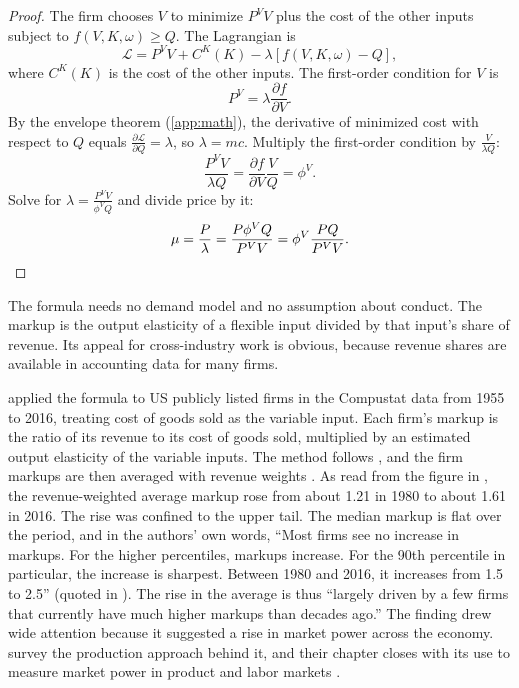 \begin{proof}
The firm chooses $V$ to minimize $P^V V$ plus the cost of the other inputs subject to $f(V, K, \omega) \ge
Q$. The Lagrangian is
\[
\mathcal{L} = P^V V + C^K(K) - \lambda \left[ f(V, K, \omega) - Q \right],
\]
where $C^K(K)$ is the cost of the other inputs. The first-order condition for $V$ is
\[
P^V = \lambda \frac{\partial f}{\partial V}.
\]
By the envelope theorem (\cref{app:math}), the derivative of minimized cost with respect to $Q$ equals
$\frac{\partial \mathcal{L}}{\partial Q} = \lambda$, so $\lambda = mc$. Multiply the first-order condition
by $\frac{V}{\lambda Q}$:
\[
\frac{P^V V}{\lambda Q} = \frac{\partial f}{\partial V} \frac{V}{Q} = \phi^V .
\]
Solve for $\lambda = \frac{P^V V}{\phi^V Q}$ and divide price by it:
\[
\mu = \frac{P}{\lambda} = \frac{P \phi^V Q}{P^V V} = \phi^V \frac{PQ}{P^V V}.
\qedhere
\]
\end{proof}

The formula needs no demand model and no assumption about conduct. The markup is the output elasticity
of a flexible input divided by that input's share of revenue. Its appeal for cross-industry work is
obvious, because revenue shares are available in accounting data for many firms.

\citet{DeLoeckerEeckhoutUnger2020} applied the formula to US publicly listed firms in the Compustat data from
1955 to 2016, treating cost of goods sold as the variable input. Each firm's markup is the ratio of its revenue
to its cost of goods sold, multiplied by an estimated output elasticity of the variable inputs. The method
follows \citet{DeLoeckerWarzynski2012}, and the firm markups are then averaged with revenue weights
\citep[p.~258 and n.~203]{AskerNocke2021}. As read from the figure in \citet[Figure~11, p.~259]{AskerNocke2021},
the revenue-weighted average markup rose from about 1.21 in 1980 to about 1.61 in 2016. The rise was confined to
the upper tail. The median markup is flat over the period, and in the authors' own words, ``Most firms see no
increase in markups. For the higher percentiles, markups increase. For the 90th percentile in particular, the
increase is sharpest. Between 1980 and 2016, it increases from 1.5 to 2.5'' (quoted in
\citealp[p.~258]{AskerNocke2021}). The rise in the average is thus ``largely driven by a few firms that currently
have much higher markups than decades ago.'' The finding drew wide attention because it suggested a rise in
market power across the economy. \citet{DeLoeckerSyverson2021} survey the production approach behind it, and
their chapter closes with its use to measure market power in product and labor markets
\citep[Preface, p.~xvi]{HoHortacsuLizzeri2021}.

